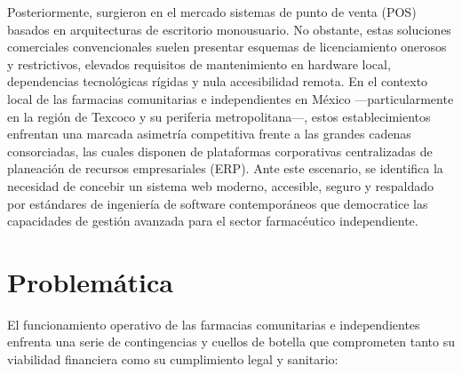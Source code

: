 Posteriormente, surgieron en el mercado sistemas de punto de venta (POS) basados en arquitecturas de escritorio monousuario. No obstante, estas soluciones comerciales convencionales suelen presentar esquemas de licenciamiento onerosos y restrictivos, elevados requisitos de mantenimiento en hardware local, dependencias tecnológicas rígidas y nula accesibilidad remota. En el contexto local de las farmacias comunitarias e independientes en México ---particularmente en la región de Texcoco y su periferia metropolitana---, estos establecimientos enfrentan una marcada asimetría competitiva frente a las grandes cadenas consorciadas, las cuales disponen de plataformas corporativas centralizadas de planeación de recursos empresariales (ERP). Ante este escenario, se identifica la necesidad de concebir un sistema web moderno, accesible, seguro y respaldado por estándares de ingeniería de software contemporáneos que democratice las capacidades de gestión avanzada para el sector farmacéutico independiente.

\section{Problemática}

El funcionamiento operativo de las farmacias comunitarias e independientes enfrenta una serie de contingencias y cuellos de botella que comprometen tanto su viabilidad financiera como su cumplimiento legal y sanitario:

